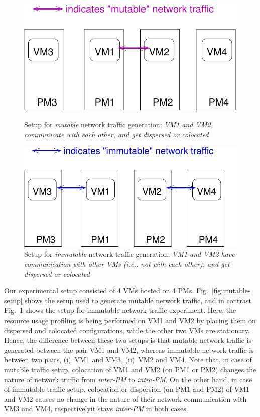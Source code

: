 \begin{figure}
    \RawFloats
    \begin{minipage}{0.45\textwidth}
    \centering
    \includegraphics[scale=0.6]{figures/mutable-setup.pdf}
    \caption{Setup for \textit{mutable} network traffic generation: \textit{VM1 and VM2 communicate with each other, and get dispersed or colocated}}
    \label{fig:mutable-setup}
    \end{minipage}
    \hfill
    \begin{minipage}{0.45\textwidth}
    \centering
    \includegraphics[scale=0.6]{figures/immutable-setup.pdf}
    \caption{Setup for \textit{immutable} network traffic generation: \textit{VM1 and VM2 have communication with other VMs (i.e., not with each other), and get dispersed or colocated}}
    \label{fig:immutable-setup}
    \end{minipage}
\end{figure}

Our experimental setup consisted of 4 VMs hosted on 4 PMs.
Fig.~\ref{fig:mutable-setup} shows the setup used to generate
mutable network traffic, and in contrast Fig.~\ref{fig:immutable-setup}
shows the setup for immutable network traffic experiment.
Here, the resource usage profiling is being performed
on VM1 and VM2 by placing them on dispersed and colocated
configurations, while the other two VMs are stationary.
Hence, the difference between these two setups is that 
mutable network traffic is generated between the pair VM1 and VM2,
whereas immutable network traffic is between two pairs,
(i)~VM1 and VM3, (ii)~VM2 and VM4.
Note that, in case of mutable traffic setup, colocation of
VM1 and VM2 (on PM1 or PM2) changes the nature of network traffic from 
\textit{inter-PM} to \textit{intra-PM}.
On the other hand, in case of immutable traffic setup, colocation or 
dispersion (on PM1 and PM2)
of VM1 and VM2 causes no change in the nature of their
network communication with VM3 and VM4, respectively\textemdash{}it stays
\textit{inter-PM} in both cases.

